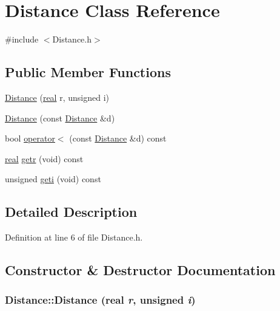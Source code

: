 \section{Distance Class Reference}
\label{classDistance}


{\ttfamily \#include $<$Distance.h$>$}

\subsection*{Public Member Functions}
\begin{DoxyCompactItemize}
\item 
\hyperlink{classDistance_a339b90a8e5ae990b614f76ac5e9f0eff}{Distance} (\hyperlink{Global_8h_a031f8951175b43076c2084a6c2173410}{real} r, unsigned i)
\item 
\hyperlink{classDistance_ae27d1f8eca9cda4e4435c933e94daa53}{Distance} (const \hyperlink{classDistance}{Distance} \&d)
\item 
bool \hyperlink{classDistance_adbc75c8ac852f175039550e87d46fb93}{operator$<$} (const \hyperlink{classDistance}{Distance} \&d) const 
\item 
\hyperlink{Global_8h_a031f8951175b43076c2084a6c2173410}{real} \hyperlink{classDistance_ad77d83cf3886ee7a9e72601929f7ef5b}{getr} (void) const 
\item 
unsigned \hyperlink{classDistance_abeeb96ec725b1cb54a3c3e1f26b1f672}{geti} (void) const 
\end{DoxyCompactItemize}


\subsection{Detailed Description}


Definition at line 6 of file Distance.h.



\subsection{Constructor \& Destructor Documentation}
\subsubsection[{Distance}]{\setlength{\rightskip}{0pt plus 5cm}Distance::Distance ({\bf real} {\em r}, \/  unsigned {\em i})}\label{classDistance_a339b90a8e5ae990b614f76ac5e9f0eff}


